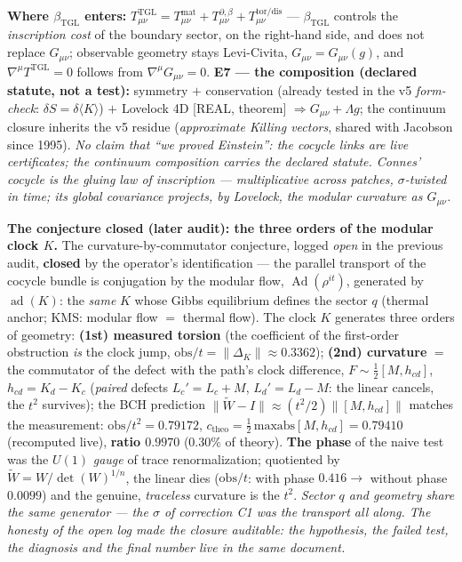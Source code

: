 \documentclass[11pt]{article}
\newcommand{\bTGL}{\beta_{\mathrm{TGL}}}\newcommand{\Msun}{M_{\odot}}\newcommand{\TGL}{\mathrm{TGL}}
\theoremstyle{definition}\newtheorem{deriv}{Derivation}
\begin{document}
\textbf{Where $\bTGL$ enters:} $T^{\mathrm{TGL}}_{\mu\nu}=T^{\mathrm{mat}}_{\mu\nu}+T^{\partial,\beta}_{\mu\nu}+T^{\mathrm{tor/dis}}_{\mu\nu}$ --- $\bTGL$ controls the \emph{inscription cost} of the boundary sector, on the right-hand side, and does not replace $G_{\mu\nu}$; observable geometry stays Levi-Civita, $G_{\mu\nu}=G_{\mu\nu}(g)$, and $\nabla^\mu T^{\mathrm{TGL}}=0$ follows from $\nabla^\mu G_{\mu\nu}=0$. \textbf{E7 --- the composition (declared statute, not a test):} symmetry $+$ conservation (already tested in the v5 \emph{form-check}: $\delta S=\delta\langle K\rangle$) $+$ Lovelock 4D \textsf{[REAL, theorem]} $\Rightarrow G_{\mu\nu}+\Lambda g$; the continuum closure inherits the v5 residue (\emph{approximate Killing vectors}, shared with Jacobson since 1995). \emph{No claim that ``we proved Einstein'': the cocycle links are live certificates; the continuum composition carries the declared statute. Connes' cocycle is the gluing law of inscription --- multiplicative across patches, $\sigma$-twisted in time; its global covariance projects, by Lovelock, the modular curvature as $G_{\mu\nu}$.}

\textbf{The conjecture closed (later audit): the three orders of the modular clock $K$.} The curvature-by-commutator conjecture, logged \emph{open} in the previous audit, \textbf{closed} by the operator's identification --- the parallel transport of the cocycle bundle is conjugation by the modular flow, $\operatorname{Ad}(\rho^{it})$, generated by $\operatorname{ad}(K)$: the \emph{same} $K$ whose Gibbs equilibrium defines the sector $q$ (thermal anchor; KMS: modular flow $=$ thermal flow). The clock $K$ generates three orders of geometry: \textbf{(1st) measured torsion} (the coefficient of the first-order obstruction \emph{is} the clock jump, $\mathrm{obs}/t=\lVert\Delta_K\rVert\approx0.3362$); \textbf{(2nd) curvature} $=$ the commutator of the defect with the path's clock difference, $F\sim\tfrac12[M,h_{cd}]$, $h_{cd}=K_d-K_c$ (\emph{paired} defects $L_c'=L_c+M$, $L_d'=L_d-M$: the linear cancels, the $t^2$ survives); the BCH prediction $\lVert\tilde W-I\rVert\approx(t^2/2)\lVert[M,h_{cd}]\rVert$ matches the measurement: $\mathrm{obs}/t^2=0.79172$, $c_{\mathrm{theo}}=\tfrac12\,\mathrm{maxabs}[M,h_{cd}]=0.79410$ (recomputed live), \textbf{ratio $0.9970$} ($0.30\%$ of theory). \textbf{The phase} of the naive test was the $U(1)$ \emph{gauge} of trace renormalization; quotiented by $\tilde W=W/\det(W)^{1/n}$, the linear dies ($\mathrm{obs}/t$: with phase $0.416\to$ without phase $0.0099$) and the genuine, \emph{traceless} curvature is the $t^2$. \emph{Sector $q$ and geometry share the same generator --- the $\sigma$ of correction C1 was the transport all along. The honesty of the open log made the closure auditable: the hypothesis, the failed test, the diagnosis and the final number live in the same document.}
\end{document}
